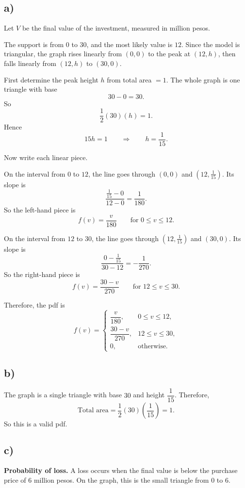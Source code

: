 	\subsection*{a)}
	Let $V$ be the final value of the investment, measured in million pesos.
	
	The support is from $0$ to $30$, and the most likely value is $12$. Since the model is triangular, the graph rises linearly from $(0,0)$ to the peak at $(12,h)$, then falls linearly from $(12,h)$ to $(30,0)$.
	
	First determine the peak height $h$ from total area $=1$. The whole graph is one triangle with base
	\[
	30-0=30.
	\]
	So
	\[
	\frac12(30)(h)=1.
	\]
	Hence
	\[
	15h=1
	\qquad \Rightarrow \qquad
	h=\frac{1}{15}.
	\]
	
	Now write each linear piece.
	
	On the interval from $0$ to $12$, the line goes through $(0,0)$ and $(12,\tfrac{1}{15})$. Its slope is
	\[
	\frac{\tfrac{1}{15}-0}{12-0}=\frac{1}{180}.
	\]
	So the left-hand piece is
	\[
	f(v)=\frac{v}{180}\qquad \text{for }0\le v\le 12.
	\]
	
	On the interval from $12$ to $30$, the line goes through $(12,\tfrac{1}{15})$ and $(30,0)$. Its slope is
	\[
	\frac{0-\tfrac{1}{15}}{30-12}=-\frac{1}{270}.
	\]
	So the right-hand piece is
	\[
	f(v)=\frac{30-v}{270}\qquad \text{for }12\le v\le 30.
	\]
	
	Therefore, the pdf is
	\[
	f(v)=
	\begin{cases}
		\dfrac{v}{180}, & 0\le v\le 12,\\[6pt]
		\dfrac{30-v}{270}, & 12\le v\le 30,\\[6pt]
		0, & \text{otherwise.}
	\end{cases}
	\]
	
	\subsection*{b)}
	The graph is a single triangle with base $30$ and height $\dfrac{1}{15}$. Therefore,
	\[
	\text{Total area}=\frac12(30)\left(\frac{1}{15}\right)=1.
	\]
	So this is a valid pdf.
	
	\subsection*{c)}
	\textbf{Probability of loss.} A loss occurs when the final value is below the purchase price of $6$ million pesos. On the graph, this is the small triangle from $0$ to $6$.
	

